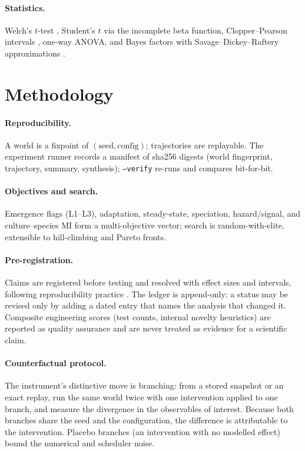 \documentclass[11pt,a4paper]{article}
\newcommand{\code}[1]{\texttt{\small #1}}
\begin{document}
\paragraph{Statistics.} Welch's $t$-test \citep{welch1947}, Student's
$t$ \citep{student1908} via the incomplete beta function, Clopper--Pearson
intervals \citep{clopper1934}, one-way ANOVA, and Bayes factors with
Savage--Dickey--Raftery approximations \citep{jeffreys1961,kass1995}.

\section{Methodology}\label{sec:method}
\paragraph{Reproducibility.} A world is a fixpoint of $(\text{seed},
\text{config})$; trajectories are replayable. The experiment runner records a
manifest of sha256 digests (world fingerprint, trajectory, summary, synthesis);
\code{--verify} re-runs and compares bit-for-bit.

\paragraph{Objectives and search.} Emergence flags (L1--L3), adaptation,
steady-state, speciation, hazard/signal, and culture--species MI form a
multi-objective vector; search is random-with-elite, extensible to
hill-climbing and Pareto fronts.

\paragraph{Pre-registration.} Claims are registered before testing and resolved
with effect sizes and intervals, following reproducibility practice
\citep{nosek2018}. The ledger is append-only: a status may be revised only by
adding a dated entry that names the analysis that changed it. Composite
engineering scores (test counts, internal novelty heuristics) are reported as
quality assurance and are never treated as evidence for a scientific claim.

\paragraph{Counterfactual protocol.} The instrument's distinctive move is
branching: from a stored snapshot or an exact replay, run the same world twice
with one intervention applied to one branch, and measure the divergence in the
observables of interest. Because both branches share the seed and the
configuration, the difference is attributable to the intervention. Placebo
branches (an intervention with no modelled effect) bound the numerical and
scheduler noise.
\end{document}

